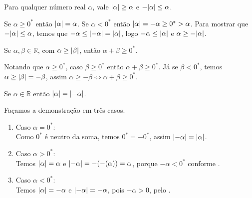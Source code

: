 \documentclass[../main.tex]{subfiles}
\begin{document}
\begin{prop}
    Para qualquer número real $\alpha$, vale $\abs{\alpha} \geq \alpha$ e $-\abs{\alpha} \leq \alpha$.
\end{prop}
\begin{dem}
    Se $\alpha \geq 0^*$ então $\abs{\alpha} = \alpha$. 
    Se $\alpha < 0^*$ então $\abs{\alpha} = -\alpha \geq 0^* > \alpha$. 
    Para mostrar que $-\abs{\alpha} \leq \alpha$, temos que $-\alpha \leq \abs{-\alpha} = \abs{\alpha}$, logo $-\alpha \leq \abs{\alpha}$ e $\alpha \geq -\abs{\alpha}$.
\end{dem}
\begin{prop}\label{reais-prop-somaMod}
    Se $\alpha, \beta \in \mathbb{R}$, com $\alpha \geq \abs{\beta}$, então $\alpha + \beta \geq 0^*$.
\end{prop}
\begin{dem}
    Notando que $\alpha \geq 0^*$, caso $\beta \geq 0^*$ então $\alpha + \beta \geq 0^*$. Já se $\beta < 0^*$, temos $\alpha \geq \abs{\beta} = -\beta$, assim $\alpha \geq -\beta \iff \alpha + \beta \geq 0^*$.
\end{dem}

\begin{prop}\label{reais-prop-moduloDoMenos}
    Se $\alpha \in \mathbb{R}$ então $\abs{\alpha} = \abs{-\alpha}$.
\end{prop}
\begin{dem}
    Façamos a demonstração em três casos.
    \begin{enumerate}[label=(\roman*)]
        \item Caso $\alpha = 0^*$: \\
        Como $0^*$ é neutro da soma, temos $0^* = -0^*$, assim $\abs{-\alpha} = \abs{\alpha}$.
        \item Caso $\alpha > 0^*$: \\
        Temos $\abs{\alpha} = \alpha$ e $\abs{-\alpha} = -(-(\alpha)) = \alpha$, porque $-\alpha < 0^*$ conforme .
        \item Caso $\alpha < 0^*$: \\
        Temos $\abs{\alpha} = -\alpha$ e $\abs{-\alpha} = -\alpha$, pois $-\alpha > 0$, pelo .
    \end{enumerate}
\end{dem}
\end{document}
